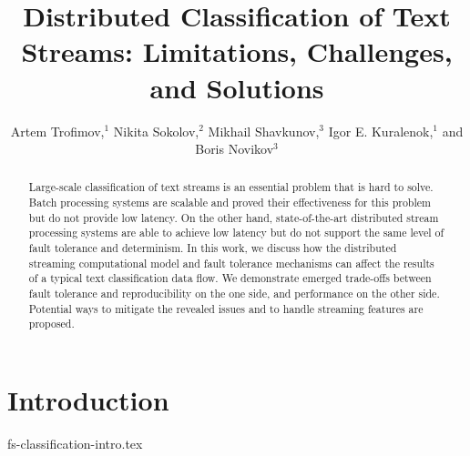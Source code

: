 \documentclass[sigconf]{acmart}
\theoremstyle{remark}
\begin{document}

\title {Distributed Classification of Text Streams: Limitations, Challenges, and Solutions}

\author{Artem Trofimov,$^ {1}$   Nikita Sokolov,$^{2}$    Mikhail Shavkunov,$^3$   Igor E. Kuralenok,$^1$    and  Boris Novikov$^ {3}$ }

\begin{abstract}

Large-scale classification of text streams is an essential problem that is hard to solve. Batch processing systems are scalable and proved their effectiveness for this problem but do not provide low latency. On the other hand, state-of-the-art distributed stream processing systems are able to achieve low latency but do not support the same level of fault tolerance and determinism. In this work, we discuss how the distributed streaming computational model and fault tolerance mechanisms can affect the results of a typical text classification data flow. We demonstrate emerged trade-offs between fault tolerance and reproducibility on the one side, and performance on the other side. Potential ways to mitigate the revealed issues and to handle streaming features are proposed.

\end{abstract}


\maketitle

\thispagestyle{empty}

\section {Introduction}
 {fs-classification-intro.tex}
\end{document}
